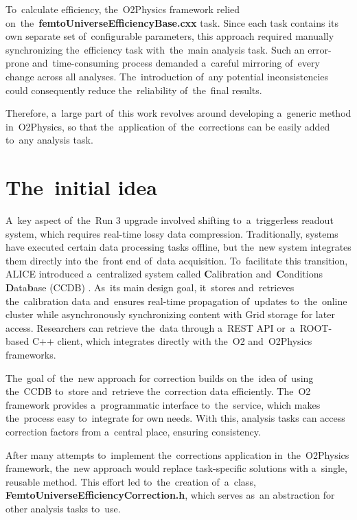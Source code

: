 \documentclass[11pt,a4paper,twoside]{book}
\numberwithin{equation}{chapter}
\begin{document}
To calculate efficiency, the O2Physics framework relied on the \textbf{femtoUniverseEfficiencyBase.cxx} task. Since each task contains its own separate set of configurable parameters, this approach required manually synchronizing the efficiency task with the main analysis task. Such an error-prone and time-consuming process demanded a careful mirroring of every change across all analyses. The introduction of any potential inconsistencies could consequently reduce the reliability of the final results.

Therefore, a large part of this work revolves around developing a generic method in O2Physics, so that the application of the corrections can be easily added to any analysis task.

\section{The initial idea}

A key aspect of the Run 3 upgrade involved shifting to a triggerless readout system, which requires real-time lossy data compression. Traditionally, systems have executed certain data processing tasks offline, but the new system integrates them directly into the front end of data acquisition. To facilitate this transition, ALICE introduced a centralized system called \textbf{C}alibration and \textbf{C}onditions \textbf{D}ata\textbf{b}ase (CCDB) \cite{ccdb-alice-run3}. As its main design goal, it stores and retrieves the calibration data and ensures real-time propagation of updates to the online cluster while asynchronously synchronizing content with Grid storage for later access. Researchers can retrieve the data through a REST API or a ROOT-based C++ client, which integrates directly with the O2 and O2Physics frameworks.

The goal of the new approach for correction builds on the idea of using the CCDB to store and retrieve the correction data efficiently. The O2 framework provides a programmatic interface to the service, which makes the process easy to integrate for own needs. With this, analysis tasks can access correction factors from a central place, ensuring consistency.

After many attempts to implement the corrections application in the O2Physics framework, the new approach would replace task-specific solutions with a single, reusable method. This effort led to the creation of a class, \textbf{FemtoUniverseEfficiencyCorrection.h}, which serves as an abstraction for other analysis tasks to use.
\end{document}
